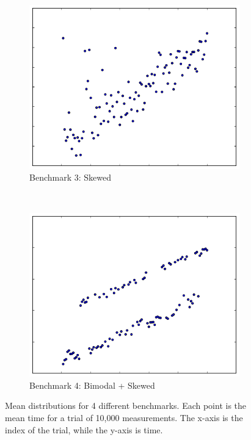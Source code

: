 \documentclass[conference]{IEEEtran}
\begin{document}
\begin{figure}
\begin{subfigure}{0.22\textwidth}
    \centering
    \includegraphics[width=\textwidth]{figures/fig1/drift_manyallocs_slow}
    \caption{Benchmark 3: Skewed}
\end{subfigure}
~
\begin{subfigure}{0.22\textwidth}
    \centering
    \includegraphics[width=\textwidth]{figures/fig1/bimodal_drift_sumindex}
    \caption{Benchmark 4: Bimodal + Skewed}
\end{subfigure}

\caption{Mean distributions for 4 different benchmarks. Each point is the mean time for a
         trial of 10,000 measurements. The x-axis is the index of the trial, while the
         y-axis is time.}
\label{fig:meandistributions}
\end{figure}
\end{document}
